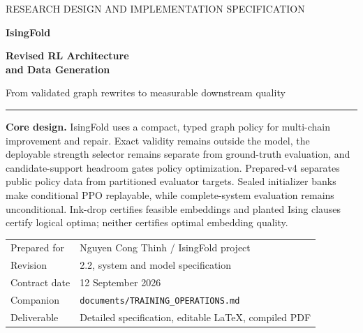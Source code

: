 \documentclass[11pt,a4paper]{article}
\newcommand{\code}[1]{\texttt{\small #1}}
\theoremstyle{definition}\newtheorem{definition}[proposition]{Definition}
\begin{document}
\begin{titlepage}
\color{Navy}
\vspace*{12mm}
{\small\sffamily RESEARCH DESIGN AND IMPLEMENTATION SPECIFICATION}\par
\vspace{15mm}
{\Huge\bfseries IsingFold}\par
\vspace{6mm}
{\LARGE\bfseries Revised RL Architecture\\and Data Generation}\par
\vspace{7mm}
{\large From validated graph rewrites to measurable downstream quality}\par
\vspace{12mm}
\rule{\textwidth}{1pt}\par
\vspace{6mm}
\begin{decisionbox}
\textbf{Core design.} IsingFold uses a compact, typed graph policy for multi-chain improvement and repair. Exact validity remains outside the model, the deployable strength selector remains separate from ground-truth evaluation, and candidate-support headroom gates policy optimization. Prepared-v4 separates public policy data from partitioned evaluator targets. Sealed initializer banks make conditional PPO replayable, while complete-system evaluation remains unconditional. Ink-drop certifies feasible embeddings and planted Ising clauses certify logical optima; neither certifies optimal embedding quality.
\end{decisionbox}
\vfill
\begin{tabular}{@{}ll}
Prepared for & Nguyen Cong Thinh / IsingFold project\\
Revision & 2.2, system and model specification\\
Contract date & 12 September 2026\\
Companion & \code{documents/TRAINING\_OPERATIONS.md}\\
Deliverable & Detailed specification, editable LaTeX, compiled PDF
\end{tabular}
\vspace{12mm}
\end{titlepage}

\clearpage{\small\setlength{\parskip}{0pt}\tableofcontents}
\clearpage{}








\clearpage\appendix
\clearpage
\end{document}
